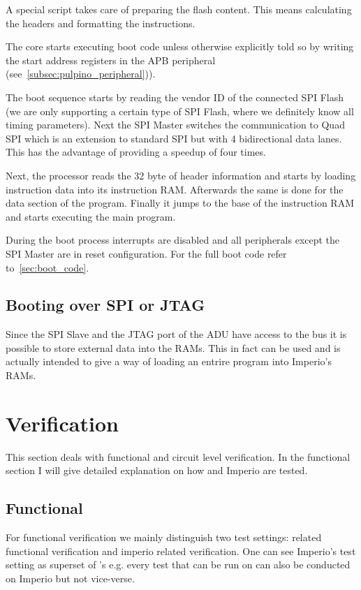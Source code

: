 A special script takes care of preparing the flash content. This means calculating the headers and formatting the instructions.

The core starts executing boot code unless otherwise explicitly told so by writing the start address registers in the \pulpino APB peripheral (see~\ref{subsec:pulpino_peripheral})). 

The boot sequence starts by reading the vendor ID of the connected SPI Flash (we are only supporting a certain type of SPI Flash, where we definitely know all timing parameters). Next the SPI Master switches the communication to Quad SPI which is an extension to standard SPI but with 4 bidirectional data lanes. This has the advantage of providing a speedup of four times.

Next, the processor reads the 32 byte of header information and starts by loading instruction data into its instruction RAM. Afterwards the same is done for the data section of the program. Finally it jumps to the base of the instruction RAM and starts executing the main program.

During the boot process interrupts are disabled and all peripherals except the SPI Master are in reset configuration. For the full boot code refer to~\ref{sec:boot_code}.

\subsection{Booting over SPI or JTAG}

Since the SPI Slave and the JTAG port of the ADU have access to the bus it is possible to store external data into the RAMs. This in fact can be used and is actually intended to give a way of loading an entrire program into Imperio's RAMs.


\section{Verification}

This section deals with functional and circuit level verification. In the functional section I will give detailed explanation on how \pulpino and Imperio are tested.

\subsection{Functional}

For functional verification we mainly distinguish two test settings: \pulpino related functional verification and imperio related verification. One can see Imperio's test setting as superset of \pulpino's e.g. every test that can be run on \pulpino can also be conducted on Imperio but not vice-verse.

